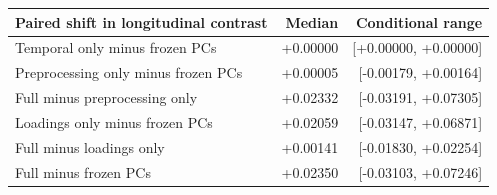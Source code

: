 \begin{tabular}{lrr}
\toprule
Paired shift in longitudinal contrast & Median & Conditional range \\
\midrule
Temporal only minus frozen PCs & +0.00000 & [+0.00000, +0.00000] \\
Preprocessing only minus frozen PCs & +0.00005 & [-0.00179, +0.00164] \\
Full minus preprocessing only & +0.02332 & [-0.03191, +0.07305] \\
Loadings only minus frozen PCs & +0.02059 & [-0.03147, +0.06871] \\
Full minus loadings only & +0.00141 & [-0.01830, +0.02254] \\
Full minus frozen PCs & +0.02350 & [-0.03103, +0.07246] \\
\bottomrule
\end{tabular}
